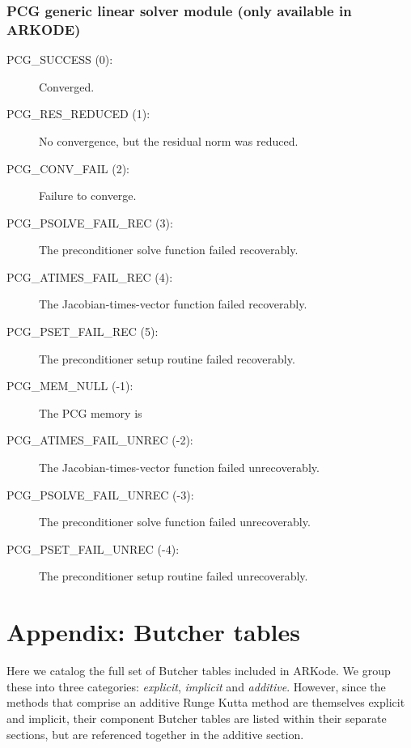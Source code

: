 \documentclass[letterpaper,10pt,english]{sphinxmanual}
\begin{document}
\subsection{PCG generic linear solver module (only available in ARKODE)}
\label{Constants:pcg-generic-linear-solver-module-only-available-in-arkode}\begin{description}
\item[{PCG\_SUCCESS  (0):}] \leavevmode
Converged.

\item[{PCG\_RES\_REDUCED  (1):}] \leavevmode
No convergence, but the residual norm
was reduced.

\item[{PCG\_CONV\_FAIL  (2):}] \leavevmode
Failure to converge.

\item[{PCG\_PSOLVE\_FAIL\_REC  (3):}] \leavevmode
The preconditioner solve function
failed recoverably.

\item[{PCG\_ATIMES\_FAIL\_REC  (4):}] \leavevmode
The Jacobian-times-vector function
failed recoverably.

\item[{PCG\_PSET\_FAIL\_REC  (5):}] \leavevmode
The preconditioner setup routine
failed recoverably.

\item[{PCG\_MEM\_NULL  (-1):}] \leavevmode
The PCG memory is 

\item[{PCG\_ATIMES\_FAIL\_UNREC  (-2):}] \leavevmode
The Jacobian-times-vector function
failed unrecoverably.

\item[{PCG\_PSOLVE\_FAIL\_UNREC  (-3):}] \leavevmode
The preconditioner solve function
failed unrecoverably.

\item[{PCG\_PSET\_FAIL\_UNREC  (-4):}] \leavevmode
The preconditioner setup routine
failed unrecoverably.

\end{description}


\chapter{Appendix: Butcher tables}
\label{Butcher::doc}\label{Butcher:appendix-butcher-tables}\label{Butcher:butcher}
Here we catalog the full set of Butcher tables included in ARKode.
We group these into three categories: \emph{explicit}, \emph{implicit} and
\emph{additive}.  However, since the methods that comprise an additive
Runge Kutta method are themselves explicit and implicit, their
component Butcher tables are listed within their separate
sections, but are referenced together in the additive section.
\end{document}
